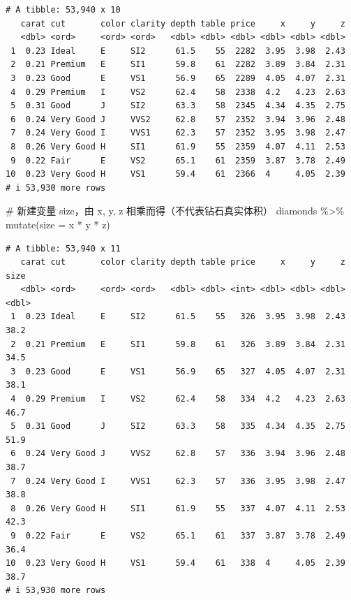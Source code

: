 \documentclass[
  letterpaper,
]{ctexbook}
\newenvironment{Shaded}{\begin{snugshade}}{\end{snugshade}}
\newcommand{\AttributeTok}[1]{\textcolor[rgb]{0.40,0.45,0.13}{#1}}
\newcommand{\CommentTok}[1]{\textcolor[rgb]{0.37,0.37,0.37}{#1}}
\newcommand{\FunctionTok}[1]{\textcolor[rgb]{0.28,0.35,0.67}{#1}}
\newcommand{\NormalTok}[1]{\textcolor[rgb]{0.00,0.23,0.31}{#1}}
\newcommand{\SpecialCharTok}[1]{\textcolor[rgb]{0.37,0.37,0.37}{#1}}
\begin{document}
\begin{verbatim}
# A tibble: 53,940 x 10
   carat cut       color clarity depth table price     x     y     z
   <dbl> <ord>     <ord> <ord>   <dbl> <dbl> <dbl> <dbl> <dbl> <dbl>
 1  0.23 Ideal     E     SI2      61.5    55  2282  3.95  3.98  2.43
 2  0.21 Premium   E     SI1      59.8    61  2282  3.89  3.84  2.31
 3  0.23 Good      E     VS1      56.9    65  2289  4.05  4.07  2.31
 4  0.29 Premium   I     VS2      62.4    58  2338  4.2   4.23  2.63
 5  0.31 Good      J     SI2      63.3    58  2345  4.34  4.35  2.75
 6  0.24 Very Good J     VVS2     62.8    57  2352  3.94  3.96  2.48
 7  0.24 Very Good I     VVS1     62.3    57  2352  3.95  3.98  2.47
 8  0.26 Very Good H     SI1      61.9    55  2359  4.07  4.11  2.53
 9  0.22 Fair      E     VS2      65.1    61  2359  3.87  3.78  2.49
10  0.23 Very Good H     VS1      59.4    61  2366  4     4.05  2.39
# i 53,930 more rows
\end{verbatim}

\begin{Shaded}
\begin{Highlighting}[]
\CommentTok{\# 新建变量 size，由 x, y, z 相乘而得（不代表钻石真实体积）}
\NormalTok{diamonds }\SpecialCharTok{\%\textgreater{}\%}
  \FunctionTok{mutate}\NormalTok{(}\AttributeTok{size =}\NormalTok{ x }\SpecialCharTok{*}\NormalTok{ y }\SpecialCharTok{*}\NormalTok{ z)}
\end{Highlighting}
\end{Shaded}

\begin{verbatim}
# A tibble: 53,940 x 11
   carat cut       color clarity depth table price     x     y     z  size
   <dbl> <ord>     <ord> <ord>   <dbl> <dbl> <int> <dbl> <dbl> <dbl> <dbl>
 1  0.23 Ideal     E     SI2      61.5    55   326  3.95  3.98  2.43  38.2
 2  0.21 Premium   E     SI1      59.8    61   326  3.89  3.84  2.31  34.5
 3  0.23 Good      E     VS1      56.9    65   327  4.05  4.07  2.31  38.1
 4  0.29 Premium   I     VS2      62.4    58   334  4.2   4.23  2.63  46.7
 5  0.31 Good      J     SI2      63.3    58   335  4.34  4.35  2.75  51.9
 6  0.24 Very Good J     VVS2     62.8    57   336  3.94  3.96  2.48  38.7
 7  0.24 Very Good I     VVS1     62.3    57   336  3.95  3.98  2.47  38.8
 8  0.26 Very Good H     SI1      61.9    55   337  4.07  4.11  2.53  42.3
 9  0.22 Fair      E     VS2      65.1    61   337  3.87  3.78  2.49  36.4
10  0.23 Very Good H     VS1      59.4    61   338  4     4.05  2.39  38.7
# i 53,930 more rows
\end{verbatim}
\end{document}

